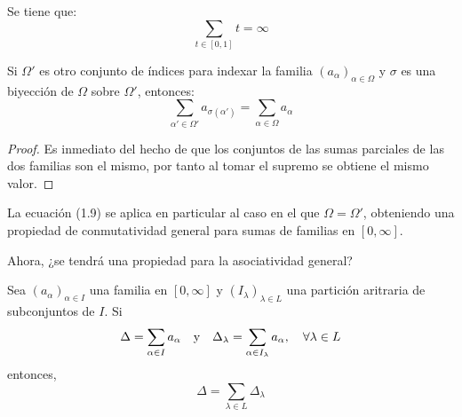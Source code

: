 \documentclass[12pt]{report}
\theoremstyle{largebreak}
\begin{document}
    \begin{exa}
        Se tiene que:
        \begin{equation*}
            \sum_{t\in[0,1]}t=\infty
        \end{equation*}
    \end{exa}

    \begin{propo}
        Si $\Omega'$ es otro conjunto de índices para indexar la familia $\left(a_\alpha\right)_{\alpha\in\Omega}$ y $\sigma$ es una biyección de $\Omega$ sobre $\Omega'$, entonces:
        \begin{equation}
            \sum_{\alpha'\in\Omega'}a_{\sigma(\alpha')}=\sum_{\alpha\in\Omega}a_\alpha
        \end{equation}
    \end{propo}

    \begin{proof}
        Es inmediato del hecho de que los conjuntos de las sumas parciales de las dos familias son el mismo, por tanto al tomar el supremo se obtiene el mismo valor.
    \end{proof}

    La ecuación (1.9) se aplica en particular al caso en el que $\Omega=\Omega'$, obteniendo una propiedad de conmutatividad general para sumas de familias en $[0,\infty]$.

    Ahora, ¿se tendrá una propiedad para la asociatividad general?

    \begin{theor}
        Sea $\left(a_\alpha\right)_{\alpha\in I}$ una familia en $[0,\infty]$ y $\left(I_\lambda\right)_{\lambda\in L}$ una partición aritraria de subconjuntos de $I$. Si
        \begin{equation*}
            \Delta=\sum_{\alpha\in I}a_\alpha\quad\textup{y}\quad\Delta_\lambda=\sum_{\alpha\in I_\lambda}a_\alpha,\quad\forall\lambda\in L
        \end{equation*}
        entonces,
        \begin{equation*}
            \Delta=\sum_{\lambda\in L}\Delta_\lambda
        \end{equation*}
    \end{theor}
\end{document}
